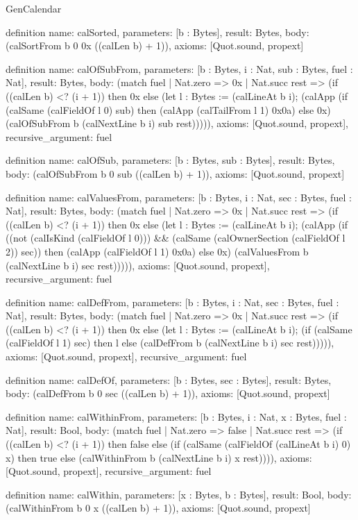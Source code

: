 \begin{lexlean}{GenCalendar}
\begin{semanticmodule}
definition{
  name: calSorted,
  parameters: [b : Bytes],
  result: Bytes,
  body: (calSortFrom b 0 0x ((calLen b) + 1)),
  axioms: [Quot.sound, propext]
}

definition{
  name: calOfSubFrom,
  parameters: [b : Bytes, i : Nat, sub : Bytes, fuel : Nat],
  result: Bytes,
  body: (match fuel
    | Nat.zero => 0x
    | Nat.succ rest => (if ((calLen b) <? (i + 1)) then 0x else (let l : Bytes := (calLineAt b i); (calApp (if (calSame (calFieldOf l 0) sub) then (calApp (calTailFrom l 1) 0x0a) else 0x) (calOfSubFrom b (calNextLine b i) sub rest))))),
  axioms: [Quot.sound, propext],
  recursive_argument: fuel
}

definition{
  name: calOfSub,
  parameters: [b : Bytes, sub : Bytes],
  result: Bytes,
  body: (calOfSubFrom b 0 sub ((calLen b) + 1)),
  axioms: [Quot.sound, propext]
}

definition{
  name: calValuesFrom,
  parameters: [b : Bytes, i : Nat, sec : Bytes, fuel : Nat],
  result: Bytes,
  body: (match fuel
    | Nat.zero => 0x
    | Nat.succ rest => (if ((calLen b) <? (i + 1)) then 0x else (let l : Bytes := (calLineAt b i); (calApp (if ((not (calIsKind (calFieldOf l 0))) && (calSame (calOwnerSection (calFieldOf l 2)) sec)) then (calApp (calFieldOf l 1) 0x0a) else 0x) (calValuesFrom b (calNextLine b i) sec rest))))),
  axioms: [Quot.sound, propext],
  recursive_argument: fuel
}

definition{
  name: calDefFrom,
  parameters: [b : Bytes, i : Nat, sec : Bytes, fuel : Nat],
  result: Bytes,
  body: (match fuel
    | Nat.zero => 0x
    | Nat.succ rest => (if ((calLen b) <? (i + 1)) then 0x else (let l : Bytes := (calLineAt b i); (if (calSame (calFieldOf l 1) sec) then l else (calDefFrom b (calNextLine b i) sec rest))))),
  axioms: [Quot.sound, propext],
  recursive_argument: fuel
}

definition{
  name: calDefOf,
  parameters: [b : Bytes, sec : Bytes],
  result: Bytes,
  body: (calDefFrom b 0 sec ((calLen b) + 1)),
  axioms: [Quot.sound, propext]
}

definition{
  name: calWithinFrom,
  parameters: [b : Bytes, i : Nat, x : Bytes, fuel : Nat],
  result: Bool,
  body: (match fuel
    | Nat.zero => false
    | Nat.succ rest => (if ((calLen b) <? (i + 1)) then false else (if (calSame (calFieldOf (calLineAt b i) 0) x) then true else (calWithinFrom b (calNextLine b i) x rest)))),
  axioms: [Quot.sound, propext],
  recursive_argument: fuel
}

definition{
  name: calWithin,
  parameters: [x : Bytes, b : Bytes],
  result: Bool,
  body: (calWithinFrom b 0 x ((calLen b) + 1)),
  axioms: [Quot.sound, propext]
}


\end{semanticmodule}
\end{lexlean}
